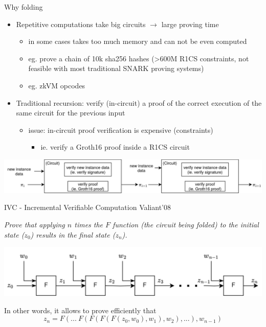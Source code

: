 \documentclass[t]{beamer} \usefonttheme[onlymath]{serif}
\begin{document}
\begin{frame}{Why folding}
  \begin{itemize}
    \item Repetitive computations take big circuits $\longrightarrow$ large proving time
    \begin{itemize}
      \item in some cases takes too much memory and can not be even computed
      \item eg. prove a chain of 10k sha256 hashes (>600M R1CS constraints, not feasible with most traditional SNARK proving systems)
      \item eg. zkVM opcodes
    \end{itemize}

    \pause
    \item Traditional recursion: verify (in-circuit) a proof of the correct execution of the same circuit for the previous input
    \begin{itemize}
      \item issue: in-circuit proof verification is expensive (constraints)
      \begin{itemize}
        \item ie. verify a Groth16 proof inside a R1CS circuit
      \end{itemize}
    \end{itemize}
  \end{itemize}

  \includegraphics[width=\textwidth]{brute-force-recursion}

\end{frame}

\begin{frame}{IVC - Incremental Verifiable Computation}
  {\tiny Valiant'08}

  \emph{Prove that applying $n$ times the $F$ function (the circuit being folded) to the initial state ($z_0$) results in the final state ($z_n$).}

  \includegraphics[width=\textwidth]{folding-main-idea-diagram}

  In other words, it allows to prove efficiently that
  $$z_n = F(...~F(F(F(F(z_0, w_0), w_1), w_2), ...), w_{n-1})$$
\end{frame}
\end{document}
